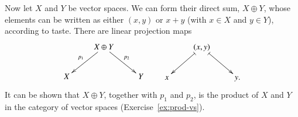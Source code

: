 \begin{example}
\label{eg:prod-vs}
Now let $X$ and $Y$ be vector spaces.  We can form their direct sum,%
%
%
%
$X \oplus Y$,%
%
%
whose elements can be written as either $(x, y)$ or $x + y$ (with $x \in
X$ and $y \in Y$), according to taste.  There are linear projection maps
\[
\xymatrix{
        &X \oplus Y \ar[ld]_{p_1} \ar[rd]^{p_2}     &       \\
X       &                                               &Y
}
%
\qquad
%
\xymatrix{
        &(x, y) \ar@{|->}[ld] \ar@{|->}[rd]     &       \\
x       &                                       &y.
}
\]
It can be shown that $X \oplus Y$, together with $p_1$ and $p_2$, is the
product of $X$ and $Y$ in the category of vector spaces
(Exercise~\ref{ex:prod-vs}).
\end{example}

